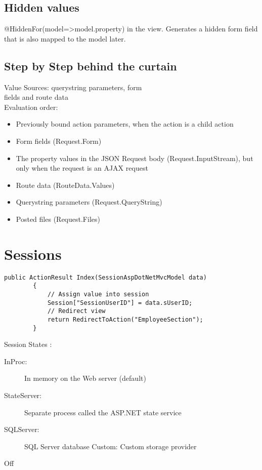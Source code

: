 \documentclass[a4paper,10pt]{scrreprt}
\begin{document}
\subsection{Hidden values}
@HiddenFor(model=>model.property) in the view.
Generates a hidden form field that is also mapped to the model later.

\subsection{Step by Step behind the curtain}
Value Sources: querystring parameters, form\\
fields and route data\\
Evaluation order:\\
\begin{itemize}
\item Previously bound action parameters, when the
action is a child action
\item Form fields (Request.Form)
\item The property values in the JSON Request body
(Request.InputStream), but only when the
request is an AJAX request
\item Route data (RouteData.Values)
\item Querystring parameters (Request.QueryString)
\item Posted files (Request.Files)
\end{itemize}

\section{Sessions}
\begin{lstlisting}[caption=using session in controller]
      public ActionResult Index(SessionAspDotNetMvcModel data)
        {
            // Assign value into session
            Session["SessionUserID"] = data.sUserID;
            // Redirect view
            return RedirectToAction("EmployeeSection");
        }
\end{lstlisting}

Session States :
\begin{description}
\item [InProc:] In memory on the Web server
(default)
\item [StateServer:] Separate process called the
ASP.NET state service
\item [SQLServer:] SQL Server database
Custom: Custom storage provider
\item [Off]
 
\end{description}
\end{document}
